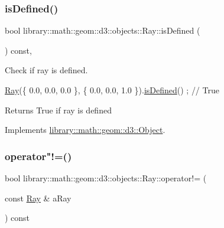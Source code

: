 \subsubsection{\texorpdfstring{is\+Defined()}{isDefined()}}
{\footnotesize\ttfamily bool library\+::math\+::geom\+::d3\+::objects\+::\+Ray\+::is\+Defined (\begin{DoxyParamCaption}{ }\end{DoxyParamCaption}) const\hspace{0.3cm}{\ttfamily [override]}, {\ttfamily [virtual]}}



Check if ray is defined. 


\begin{DoxyCode}
\hyperlink{classlibrary_1_1math_1_1geom_1_1d3_1_1objects_1_1_ray_a11b7613464daaebc6e25a758b057f203}{Ray}(\{ 0.0, 0.0, 0.0 \}, \{ 0.0, 0.0, 1.0 \}).\hyperlink{classlibrary_1_1math_1_1geom_1_1d3_1_1objects_1_1_ray_a7329f77a549a02e9c27d07c11adcc8bf}{isDefined}() ; \textcolor{comment}{// True}
\end{DoxyCode}


\begin{DoxyReturn}{Returns}
True if ray is defined 
\end{DoxyReturn}


Implements \hyperlink{classlibrary_1_1math_1_1geom_1_1d3_1_1_object_a2216442e322f0c3ca5f01a4efa22baf7}{library\+::math\+::geom\+::d3\+::\+Object}.

\mbox{\label{classlibrary_1_1math_1_1geom_1_1d3_1_1objects_1_1_ray_a0cd84346b37f62793b565c87ae4659fb}} 
\subsubsection{\texorpdfstring{operator"!=()}{operator!=()}}
{\footnotesize\ttfamily bool library\+::math\+::geom\+::d3\+::objects\+::\+Ray\+::operator!= (\begin{DoxyParamCaption}\item[{const \hyperlink{classlibrary_1_1math_1_1geom_1_1d3_1_1objects_1_1_ray}{Ray} \&}]{a\+Ray }\end{DoxyParamCaption}) const}



